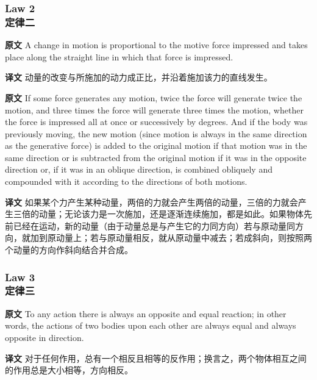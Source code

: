 \documentclass[UTF8,zihao=-4]{ctexart}
\begin{document}
\subsubsection*{Law 2\\定律二}
\noindent\textbf{原文} A change in motion is proportional to the motive force impressed and takes place along the straight line in which that force is impressed.
\par\noindent\textbf{译文} 动量的改变与所施加的动力成正比，并沿着施加该力的直线发生。
\medskip

\noindent\textbf{原文} If some force generates any motion, twice the force will generate twice the motion, and three times the force will generate three times the motion, whether the force is impressed all at once or successively by degrees. And if the body was previously moving, the new motion (since motion is always in the same direction as the generative force) is added to the original motion if that motion was in the same direction or is subtracted from the original motion if it was in the opposite direction or, if it was in an oblique direction, is combined obliquely and compounded with it according to the directions of both motions.
\par\noindent\textbf{译文} 如果某个力产生某种动量，两倍的力就会产生两倍的动量，三倍的力就会产生三倍的动量；无论该力是一次施加，还是逐渐连续施加，都是如此。如果物体先前已经在运动，新的动量（由于动量总是与产生它的力同方向）若与原动量同方向，就加到原动量上；若与原动量相反，就从原动量中减去；若成斜向，则按照两个动量的方向作斜向结合并合成。
\medskip

\subsubsection*{Law 3\\定律三}
\noindent\textbf{原文} To any action there is always an opposite and equal reaction; in other words, the actions of two bodies upon each other are always equal and always opposite in direction.
\par\noindent\textbf{译文} 对于任何作用，总有一个相反且相等的反作用；换言之，两个物体相互之间的作用总是大小相等，方向相反。
\medskip
\end{document}
